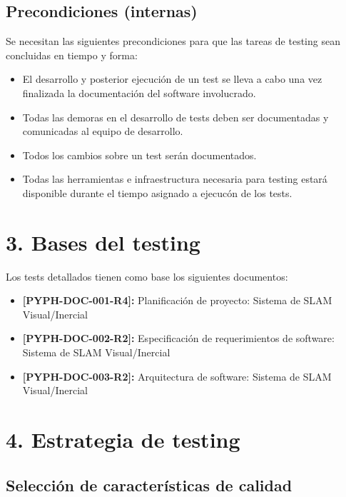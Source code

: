 \documentclass[
11pt, %
codirector, %
]{simple_charter}
\begin{document}
\subsection{Precondiciones (internas)}
\label{ssec:precondiciones-internas}

Se necesitan las siguientes precondiciones para que las tareas de testing sean concluidas en tiempo
y forma:

\begin{itemize}
	\item El desarrollo y posterior ejecución de un test se lleva a cabo una vez finalizada la
	documentación del software involucrado.
	\item Todas las demoras en el desarrollo de tests deben ser documentadas y comunicadas al equipo
	de desarrollo.
	\item  Todos los cambios sobre un test serán documentados.
	\item Todas las herramientas e infraestructura necesaria para testing estará disponible durante
	el tiempo asignado a ejecucón de los tests.
\end{itemize}

\section{3. Bases del testing}
\label{sec:3-bases-del-testing}

Los tests detallados tienen como base los siguientes documentos:

\begin{itemize}
	\item \textbf{[PYPH-DOC-001-R4]:} Planificación de proyecto: Sistema de SLAM Visual/Inercial
	\item \textbf{[PYPH-DOC-002-R2]:} Especificación de requerimientos de software: Sistema de SLAM
	Visual/Inercial
	\item \textbf{[PYPH-DOC-003-R2]:} Arquitectura de software: Sistema de SLAM Visual/Inercial
\end{itemize}

\section{4. Estrategia de testing}
\label{sec:4-estrategia-de-testing}

\subsection{Selección de características de calidad}
\label{ssec:seleccion-de-caracteristicas-de-calidad}
\end{document}
